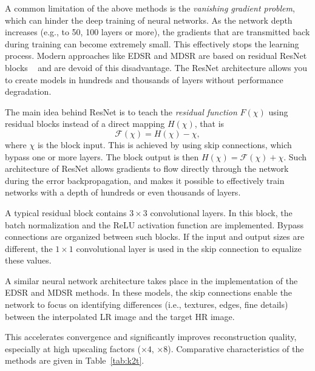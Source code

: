 \documentclass{ieeeaccess}
\begin{document}
A common limitation of the above methods is the \textit{vanishing gradient problem}, which can hinder the deep training of  neural  networks.  As the network depth increases (e.g., to 50, 100 layers or more), the gradients that are transmitted back during training can become extremely small. This effectively stops the learning process. Modern approaches like EDSR and MDSR  are based on residual ResNet blocks ~\cite{Lim_EDSR, Gao_MDSR} and are devoid of this disadvantage. The ResNet architecture allows you to create models in hundreds and thousands of layers without performance degradation.

The main idea behind ResNet is to teach the \textit{residual function} $F(\chi)$ using residual blocks instead of a direct mapping $H(\chi)$, that is 
$$
\mathcal{F}(\chi) = H(\chi) - \chi,
$$
%
where $\chi$ is the block input. 
This is achieved by using skip connections, which bypass one or more layers. The block output is then $H(\chi)=\mathcal{F}(\chi)+\chi$. 
Such architecture of ResNet allows gradients to flow directly through the network during the error backpropagation, and makes it possible to effectively train networks with a depth of hundreds or even thousands of layers.

A typical residual block contains $3\times3$ convolutional layers. 
In this block, the batch normalization and the ReLU activation function are implemented. 
Bypass connections are organized between such blocks.
If the input and output sizes are different, the $1 \times 1$ convolutional layer   is used in the skip connection to equalize  these values.

A similar neural network architecture takes place in the implementation of the EDSR and MDSR methods.
In these models, the skip connections  enable the network to focus on identifying differences (i.e., textures, edges, fine details) between the interpolated LR image and the target HR image.  

This accelerates convergence and significantly improves reconstruction quality, especially at high upscaling factors ($\times4$, $\times8$). Comparative characteristics of the methods are given in Table~\ref{tab:k2t}.
\end{document}
